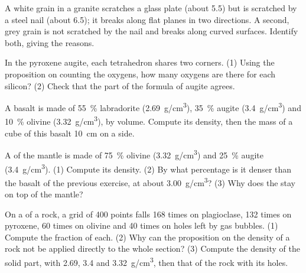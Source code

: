 \begin{exercise}[$\star\star$]\label{exo:g11:minerals:7}
A white grain in a granite scratches a glass plate (about 5.5) but is
scratched by a steel nail (about 6.5); it breaks along flat planes in two
directions. A second, grey grain is not scratched by the nail and breaks
along curved surfaces. Identify both, giving the reasons.
\end{exercise}

\begin{exercise}[$\star\star$]\label{exo:g11:minerals:8}
In the pyroxene augite, each tetrahedron shares two corners. (1) Using the
proposition on counting the oxygens, how many oxygens are there for each
silicon? (2) Check that the part  of the formula of augite
agrees.
\end{exercise}

\begin{exercise}[$\star\star$]\label{exo:g11:minerals:9}
A basalt is made of \qty{55}{\percent} labradorite (\qty{2.69}{g/cm^3}),
\qty{35}{\percent} augite (\qty{3.4}{g/cm^3}) and \qty{10}{\percent} olivine
(\qty{3.32}{g/cm^3}), by volume. Compute its density, then the mass of a
cube of this basalt \qty{10}{cm} on a side.
\end{exercise}

\begin{exercise}[$\star\star$]\label{exo:g11:minerals:10}
A  of the mantle is made of \qty{75}{\percent} olivine
(\qty{3.32}{g/cm^3}) and \qty{25}{\percent} augite (\qty{3.4}{g/cm^3}).
(1) Compute its density. (2) By what percentage is it denser than the
basalt of the previous exercise, at about \qty{3.00}{g/cm^3}? (3) Why does
the  stay on top of the mantle?
\end{exercise}

\begin{exercise}[$\star\star$]\label{exo:g11:minerals:11}
On a  of a rock, a grid of 400 points falls 168 times on
plagioclase, 132 times on pyroxene, 60 times on olivine and 40 times on
holes left by gas bubbles. (1) Compute the fraction of each. (2) Why can the
proposition on the density of a rock not be applied directly to the whole
section? (3) Compute the density of the solid part, with \qty{2.69}{},
\qty{3.4}{} and \qty{3.32}{g/cm^3}, then that of the rock with its holes.
\end{exercise}

